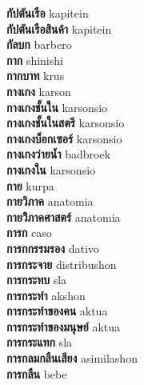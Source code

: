 \textbf{ กัปตันเรือ  } kapitein \\
\textbf{ กัปตันเรือสินค้า  } kapitein \\
\textbf{ กัลบก  } barbero \\
\textbf{ กาก  } shinishi \\
\textbf{ กากบาท  } krus \\
\textbf{ กางเกง  } karson \\
\textbf{ กางเกงชั้นใน  } karsonsio \\
\textbf{ กางเกงชั้นในสตรี  } karsonsio \\
\textbf{ กางเกงบ็อกเซอร์  } karsonsio \\
\textbf{ กางเกงว่ายน้ำ  } badbroek \\
\textbf{ กางเกงใน  } karsonsio \\
\textbf{ กาย  } kurpa \\
\textbf{ กายวิภาค  } anatomia \\
\textbf{ กายวิิภาคศาสตร์  } anatomia \\
\textbf{ การก  } caso \\
\textbf{ การกกรรมรอง  } dativo \\
\textbf{ การกระจาย  } distribushon \\
\textbf{ การกระทบ  } sla \\
\textbf{ การกระทำ  } akshon \\
\textbf{ การกระทำของคน  } aktua \\
\textbf{ การกระทำของมนุษย์  } aktua \\
\textbf{ การกระแทก  } sla \\
\textbf{ การกลมกลืนเสียง  } asimilashon \\
\textbf{ การกลืน  } bebe \\
